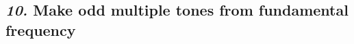 \documentclass[12pt, english]{article}
\begin{document}
\vspace{10pt}

\subsection*{\emph{10.} Make odd multiple tones from fundamental frequency}
\end{document}
